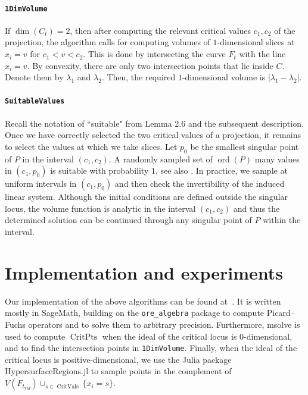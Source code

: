 \documentclass[sigconf, nonacm]{acmart} %
\newcommand{\critPts}[0]{{\operatorname{CritPts}}}
\newcommand{\ord}[0]{{\operatorname{ord}}}
\newcommand{\val}[0]{{\operatorname{val}}}
\begin{document}
\paragraph{\texttt{1DimVolume}}

If $\operatorname{dim}(C_t ) = 2$, then after computing the relevant critical values $c_1,c_2$ of the projection, the algorithm calls for computing volumes of $1$-dimensional slices at $x_i = v$ for $c_1< v< c_2$. This is done by intersecting the curve $F_t$ with the line $x_i = v$. By convexity, there are only two intersection points that lie inside $C$. Denote them by $\lambda_1$ and $\lambda_2$. Then, the required $1$-dimensional volume is $|\lambda_1 - \lambda_2 | $.

\paragraph{\texttt{SuitableValues}}

Recall the notation of ``suitable" from Lemma 2.6 and the subsequent description. Once we have correctly selected the two critical values of a projection, it remains to select the values at which we take slices.
Let $p_0$ be the smallest singular point of $P$ in the interval $(c_1,c_2)$. 
A randomly sampled set of $\ord(P)$ many values in $(c_1,p_0)$ is suitable with probability $1$, see also \cite[Section 4]{Lairez_volumes_semi_algebraic_sets}.
In practice, we sample at uniform intervals in $(c_1, p_0)$ and then check the invertibility of the induced linear system. 
Although the initial conditions are defined outside the singular locus, the volume function is analytic in the interval $(c_1,c_2)$ and thus the determined solution can be continued through any singular point of $P$ within the interval.


\section{Implementation and experiments}\label{sec:performance}

Our implementation of the above algorithms can be found at~\cite{implementation}. It is written mostly in SageMath, building on the \texttt{ore\_algebra} package to compute Picard--Fuchs operators and to solve them to arbitrary precision. Furthermore, msolve is used to compute $\critPts$ when the ideal of the critical locus is $0$-dimensional, and to find the intersection points in \texttt{1DimVolume}. Finally, when the ideal of the critical locus is positive-dimensional, we use the Julia package {HypersurfaceRegions.jl} \cite{reinke2024hypersurfacearrangementsgenerichypersurfaces} to sample points in the complement of~$V(F_{t_\val}) \cup_{s\in \operatorname{CritVals}} \{x_i = s\} $.
\end{document}
